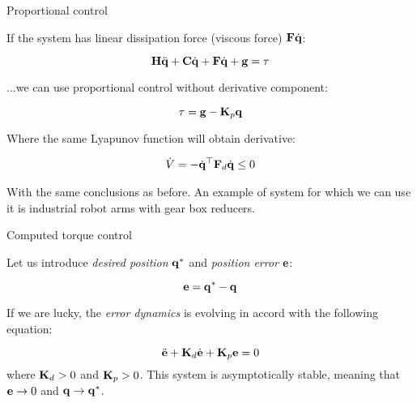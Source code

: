 \documentclass{beamer}
\begin{document}
\begin{frame}{Proportional control}
	\begin{flushleft}
		
		If the system has linear dissipation force (viscous force) $\mathbf{F} \dot{\mathbf{q}}$:
		
		\begin{equation}
			\mathbf{H} \ddot{\mathbf{q}} + \mathbf{C} \dot{\mathbf{q}} + \mathbf{F} \dot{\mathbf{q}} + \mathbf{g} = \tau
		\end{equation}
		
		...we can use proportional control without derivative component:
		
		\begin{equation}
			\tau = \mathbf{g}  - \mathbf{K}_p \mathbf{q}
		\end{equation}		
	
	Where the same Lyapunov function will obtain derivative:
	
	\begin{align}
		\dot V = 
		-\dot{\mathbf{q}}^\top  \mathbf{F}_d \dot{\mathbf{q}} \leq 0
	\end{align}	
	
		With the same conclusions as before. An example of system for which we can use it is industrial robot arms with gear box reducers.
		
	\end{flushleft}
\end{frame}





\begin{frame}{Computed torque control}
	\begin{flushleft}
		
		Let us introduce  \emph{desired position} $\mathbf{q}^*$ and \emph{position error}  $\mathbf{e}$:
		
		\begin{equation}
			\mathbf{e} = \mathbf{q}^* - \mathbf{q}
		\end{equation}
	
		If we are lucky, the \emph{error dynamics} is evolving in accord with the following equation: 
		
		\begin{equation}
	\ddot{\mathbf{e}} + \mathbf{K}_d \dot{\mathbf{e}} + \mathbf{K}_p \mathbf{e} = 0
		\end{equation}		
	where $\mathbf{K}_d > 0$ and $\mathbf{K}_p > 0$. This system is asymptotically stable, meaning that $\mathbf{e} \rightarrow 0$ and $\mathbf{q} \rightarrow \mathbf{q}^*$.
		
	\end{flushleft}
\end{frame}
\end{document}
